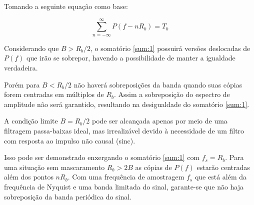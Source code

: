 Tomando a seguinte equação como base:

\begin{equation} \label{sum:1}
    \sum_{n=-\infty}^{\infty} P(f-nR_b) = T_b
\end{equation}

Considerando que $B>R_b/2$, o somatório \ref{sum:1} possuirá versões deslocadas de $P(f)$ que irão se sobrepor, havendo a possibilidade de manter a igualdade verdadeira.

Porém para $B<R_b/2$ não haverá sobreposições da banda quando suas cópias forem centradas em múltiplos de $R_b$. Assim a sobreposição do espectro de amplitude não será garantido, resultando na desigualdade do somatório \ref{sum:1}.

A condição limite $B=R_b/2$ pode ser alcançada apenas por meio de uma filtragem passa-baixas ideal, mas irrealizável devido à necessidade de um filtro com resposta ao impulso não causal (sinc).

Isso pode ser demonstrado enxergando o somatório \ref{sum:1} com $f_s = R_b$. Para uma situação sem mascaramento $R_b > 2B$ as cópias de $P(f)$ estarão centradas além dos pontos $nR_b$. Com uma frequência de amostragem $f_s$ que está além da frequência de Nyquist e uma banda limitada do sinal, garante-se que não haja sobreposição da banda periódica do sinal.  

\newpage